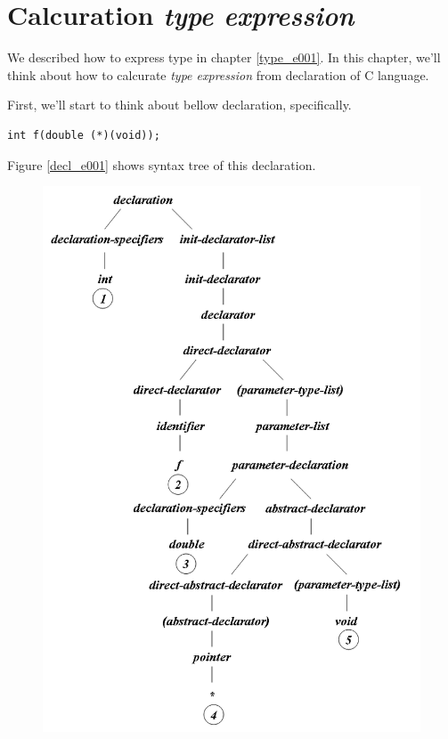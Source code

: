 \section{Calcuration {\em type expression}}
We described how to express type in chapter \ref{type_e001}.
In this chapter, we'll think about how to calcurate
{\em type expression} from declaration of C language.

First, we'll start to think about bellow declaration, specifically.
\begin{verbatim}
int f(double (*)(void));
\end{verbatim}
Figure \ref{decl_e001} shows syntax tree of this declaration.
\begin{figure}[htbp]
\begin{center}
\begin{htmlonly}
\includegraphics[width=1.0125\linewidth,height=1.4175\linewidth]{decl001.png}

\end{htmlonly}
\end{center}
\end{figure}
